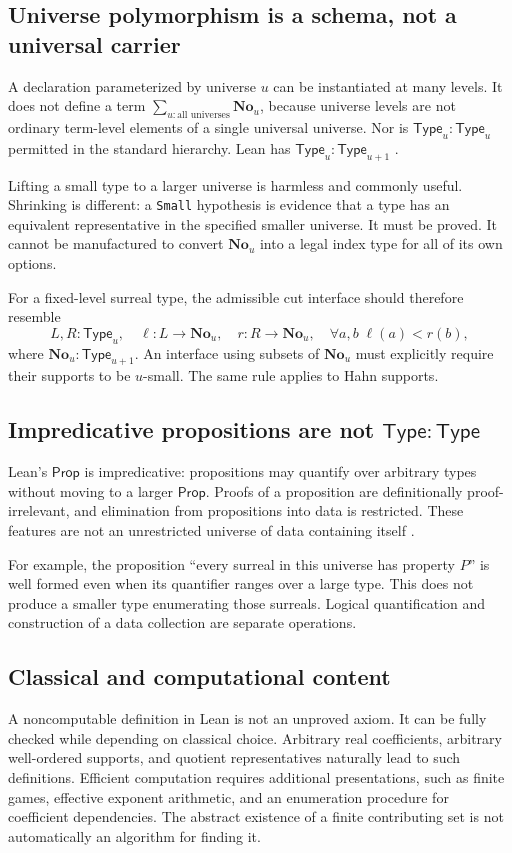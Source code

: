 \documentclass[11pt,letterpaper]{article}
\theoremstyle{definition}
\theoremstyle{remark}
\newcommand{\No}{\mathbf{No}}
\newcommand{\Type}{\mathsf{Type}}
\newcommand{\Prop}{\mathsf{Prop}}
\numberwithin{equation}{section}
\begin{document}
\subsection{Universe polymorphism is a schema, not a universal carrier}
A declaration parameterized by universe \(u\) can be instantiated at many levels. It does not define a term
\(\sum_{u:\text{all universes}}\No_u\), because universe levels are not ordinary term-level elements of a single universal universe. Nor is \(\Type_u:\Type_u\) permitted in the standard hierarchy. Lean has \(\Type_u:\Type_{u+1}\) \cite{LeanUniverses}.

Lifting a small type to a larger universe is harmless and commonly useful. Shrinking is different: a \texttt{Small} hypothesis is evidence that a type has an equivalent representative in the specified smaller universe. It must be proved. It cannot be manufactured to convert \(\No_u\) into a legal index type for all of its own options.

For a fixed-level surreal type, the admissible cut interface should therefore resemble
\[
 L,R:\Type_u,\quad \ell:L\to\No_u,\quad r:R\to\No_u,
 \quad \forall a,b\;\ell(a)<r(b),
\]
where \(\No_u:\Type_{u+1}\). An interface using subsets of \(\No_u\) must explicitly require their supports to be \(u\)-small. The same rule applies to Hahn supports.

\subsection{Impredicative propositions are not \texorpdfstring{\(\Type:\Type\)}{Type : Type}}
Lean's \(\Prop\) is impredicative: propositions may quantify over arbitrary types without moving to a larger \(\Prop\). Proofs of a proposition are definitionally proof-irrelevant, and elimination from propositions into data is restricted. These features are not an unrestricted universe of data containing itself \cite{LeanPropositions,LeanUniverses}.

For example, the proposition ``every surreal in this universe has property \(P\)'' is well formed even when its quantifier ranges over a large type. This does not produce a smaller type enumerating those surreals. Logical quantification and construction of a data collection are separate operations.

\subsection{Classical and computational content}
A noncomputable definition in Lean is not an unproved axiom. It can be fully checked while depending on classical choice. Arbitrary real coefficients, arbitrary well-ordered supports, and quotient representatives naturally lead to such definitions. Efficient computation requires additional presentations, such as finite games, effective exponent arithmetic, and an enumeration procedure for coefficient dependencies. The abstract existence of a finite contributing set is not automatically an algorithm for finding it.
\end{document}
